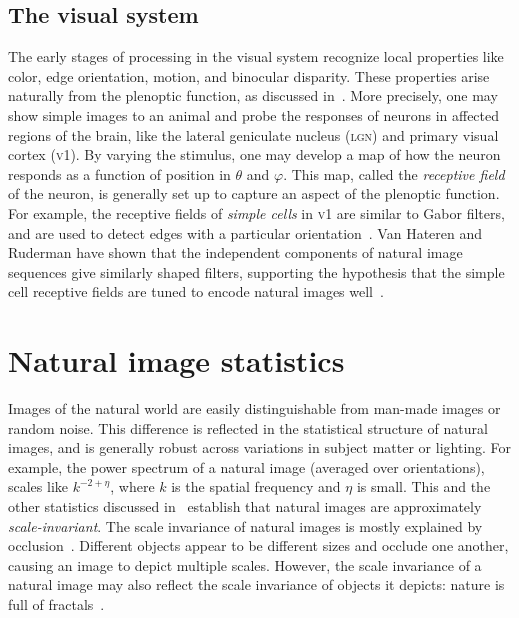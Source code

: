 \documentclass[aps,reprint,floatfix]{revtex4-2}
\theoremstyle{plain}
\theoremstyle{definition}
\renewcommand\phi\varphi%
\begin{document}
\subsection{The visual system}\label{sec:visual-system}

The early stages of processing in the visual system recognize local properties
like color, edge orientation, motion, and binocular disparity. These properties
arise naturally from the plenoptic function, as discussed in~\cite{plenoptic}.
More precisely, one may show simple images to an animal and probe the responses
of neurons in affected regions of the brain, like the lateral geniculate nucleus
(\textsc{lgn}) and primary visual cortex (\textsc{v1}). By varying the stimulus,
one may develop a map of how the neuron responds as a function of position in
$\theta$ and $\phi$. This map, called the \emph{receptive field} of the neuron,
is generally set up to capture an aspect of the plenoptic function. For example,
the receptive fields of \emph{simple cells} in \textsc{v1} are similar to Gabor
filters, and are used to detect edges with a particular
orientation~\cite{plenoptic}. Van Hateren and Ruderman have shown that the
independent components of natural image sequences give similarly shaped filters,
supporting the hypothesis that the simple cell receptive fields are tuned to
encode natural images well~\cite{strf}.

\section{Natural image statistics}\label{sec:natstat}

Images of the natural world are easily distinguishable from man-made images or
random noise. This difference is reflected in the statistical structure of
natural images, and is generally robust across variations in subject matter or
lighting. For example, the power spectrum of a natural image (averaged over
orientations), scales like $k^{-2 + \eta}$, where $k$ is the spatial frequency
and $\eta$ is small. This and the other statistics discussed in~\cite{ruderman}
establish that natural images are approximately \emph{scale-invariant}. The
scale invariance of natural images is mostly explained by
occlusion~\cite{dead-leaves}. Different objects appear to be different sizes and
occlude one another, causing an image to depict multiple scales. However, the
scale invariance of a natural image may also reflect the scale invariance of
objects it depicts: nature is full of fractals~\cite{fractals-everywhere}.
\end{document}
